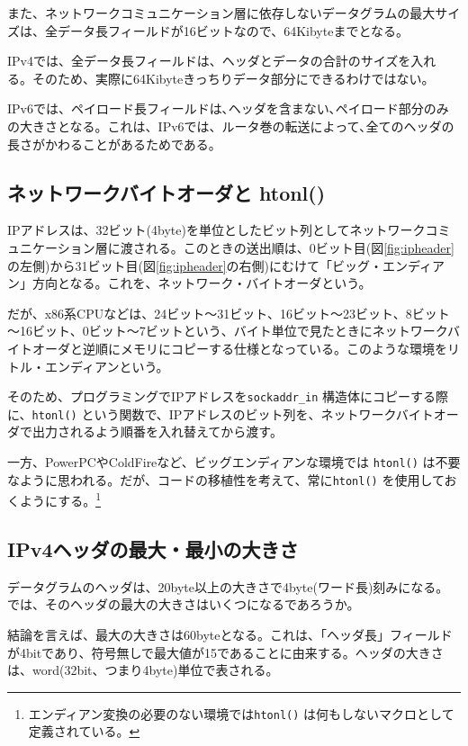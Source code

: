 また、ネットワークコミュニケーション層に依存しないデータグラムの最大サイズは、全データ長フィールドが16ビットなので、64Kibyteまでとなる。

IPv4では、全データ長フィールドは、ヘッダとデータの合計のサイズを入れる。そのため、実際に64Kibyteきっちりデータ部分にできるわけではない。

IPv6では、ペイロード長フィールドは､ヘッダを含まない､ペイロード部分のみの大きさとなる。これは、IPv6では、ルータ巻の転送によって､全てのヘッダの長さがかわることがあるためである。

\subsection{ネットワークバイトオーダと htonl()}

IPアドレスは、32ビット(4byte)を単位としたビット列としてネットワークコミュニケーション層に渡される。このときの送出順は、0ビット目(図\ref{fig:ipheader}の左側)から31ビット目(図\ref{fig:ipheader}の右側)にむけて「ビッグ・エンディアン」方向となる。これを、ネットワーク・バイトオーダという。

だが、x86系CPUなどは、24ビット～31ビット、16ビット～23ビット、8ビット～16ビット、0ビット～7ビットという、バイト単位で見たときにネットワークバイトオーダと逆順にメモリにコピーする仕様となっている。このような環境をリトル・エンディアンという。

そのため、プログラミングでIPアドレスを\verb+sockaddr_in+ 構造体にコピーする際に、\verb+htonl()+ という関数で、IPアドレスのビット列を、ネットワークバイトオーダで出力されるよう順番を入れ替えてから渡す。

一方、PowerPCやColdFireなど、ビッグエンディアンな環境では \verb+htonl()+ は不要なように思われる。だが、コードの移植性を考えて、常に\verb+htonl()+ を使用しておくようにする。\footnote{エンディアン変換の必要のない環境では\verb+htonl()+ は何もしないマクロとして定義されている。}


\subsection{IPv4ヘッダの最大・最小の大きさ}

データグラムのヘッダは、20byte以上の大きさで4byte(ワード長)刻みになる。では、そのヘッダの最大の大きさはいくつになるであろうか。

結論を言えば、最大の大きさは60byteとなる。これは、「ヘッダ長」フィールドが4bitであり、符号無しで最大値が15であることに由来する。ヘッダの大きさは、word(32bit、つまり4byte)単位で表される。

